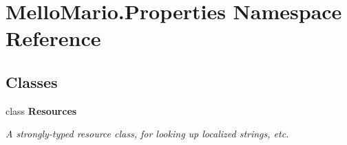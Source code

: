 \section{Mello\+Mario.\+Properties Namespace Reference}
\label{namespaceMelloMario_1_1Properties}
\subsection*{Classes}
\begin{DoxyCompactItemize}
\item 
class \textbf{ Resources}
\begin{DoxyCompactList}\small\item\em A strongly-\/typed resource class, for looking up localized strings, etc. \end{DoxyCompactList}\end{DoxyCompactItemize}
